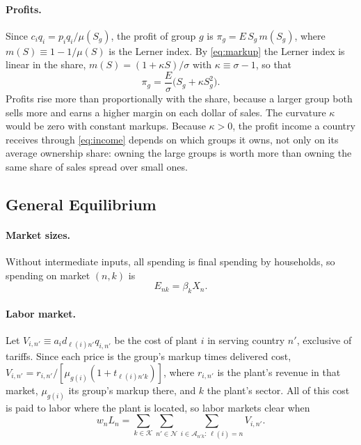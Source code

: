 \documentclass[11pt]{article}
\newcommand{\cN}{\mathcal N}
\newcommand{\cK}{\mathcal K}
\newcommand{\cA}{\mathcal A}
\begin{document}
\paragraph{Profits.} Since $c_iq_i=p_iq_i/\mu(S_g)$, the profit of group $g$ is
$\pi_g=E\,S_g\,m(S_g)$, where $m(S)\equiv1-1/\mu(S)$ is the Lerner index. By
\eqref{eq:markup} the Lerner index is linear in the share, $m(S)=(1+\kappa S)/\sigma$
with $\kappa\equiv\sigma-1$, so that
\begin{equation}
  \pi_g=\frac{E}{\sigma}\bigl(S_g+\kappa S_g^2\bigr).
  \label{eq:profit}
\end{equation}
Profits rise more than proportionally with the share, because a larger group both sells
more and earns a higher margin on each dollar of sales. The curvature $\kappa$
would be zero with constant markups. Because $\kappa>0$, the profit income a country
receives through \eqref{eq:income} depends on which groups it owns, not only on its
average ownership share: owning the large groups is worth more than owning the same
share of sales spread over small ones.

\subsection{General Equilibrium}
\label{sec:ge}

\paragraph{Market sizes.} Without intermediate inputs, all spending is final spending
by households, so spending on market $(n,k)$ is
\begin{equation}
  E_{nk}=\beta_kX_n .
  \label{eq:spending}
\end{equation}

\paragraph{Labor market.} Let $V_{i,n'}\equiv a_id_{\ell(i)n'}q_{i,n'}$ be the cost of
plant $i$ in serving country $n'$, exclusive of tariffs. Since each price is the
group's markup times delivered cost, $V_{i,n'}=r_{i,n'}/[\mu_{g(i)}(1+t_{\ell(i)n'k})]$, where
$r_{i,n'}$ is the plant's revenue in that market, $\mu_{g(i)}$ its group's markup
there, and $k$ the plant's sector. All of this cost is paid to labor where the plant is
located, so labor markets clear when
\begin{equation}
  w_nL_n=\sum_{k\in\cK}\sum_{n'\in\cN}\sum_{i\in\cA_{n'k}:\,\ell(i)=n}V_{i,n'} .
  \label{eq:labor}
\end{equation}
\end{document}
